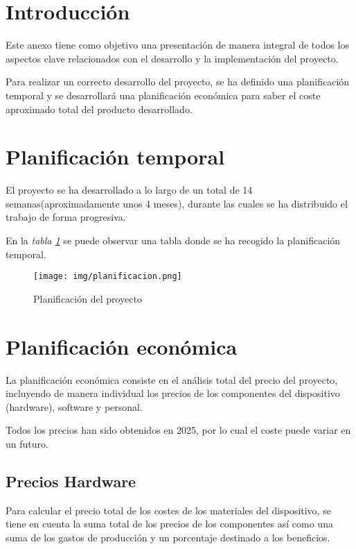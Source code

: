\section{Introducción}
Este anexo tiene como objetivo una presentación de manera integral de todos los aspectos clave relacionados con el desarrollo y la implementación del proyecto. 

Para realizar un correcto desarrollo del proyecto, se ha definido una planificación temporal y se desarrollará una planificación económica para saber el coste aproximado total del producto desarrollado.
\section{Planificación temporal}
El proyecto se ha desarrollado a lo largo de un total de 14 semanas(aproximadamente unos 4 meses), durante las cuales se ha distribuido el trabajo de forma progresiva. 

En la \textit{tabla \ref{fig:Planificación}} se puede observar una tabla donde se ha recogido la planificación temporal.
\begin{figure}[h]
        \centering
        \texttt{[image: img/planificacion.png]}
        \caption{Planificación del proyecto}
        \label{fig:Planificación}
    \end{figure}

\section{Planificación económica}

La planificación económica consiste en el análisis total del precio del proyecto, incluyendo de manera individual los precios de los componentes del dispositivo (hardware), software y personal.

Todos los precios han sido obtenidos en 2025, por lo cual el coste puede variar en un futuro. 
\subsection{Precios Hardware}
Para calcular el precio total de los costes de los materiales del dispositivo, se tiene en cuenta la suma total de los precios de los componentes así como una suma de los gastos de producción y un porcentaje destinado a los beneficios. 

